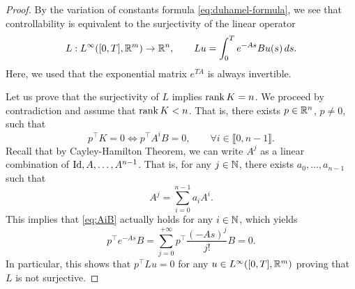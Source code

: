 \begin{proof}
    By the variation of constants formula \eqref{eq:duhamel-formula}, we see that controllability is equivalent to the surjectivity of the linear operator 
    \begin{equation}
        \label{eq:Lu}
        L : L^\infty([0,T],\mathbb{R}^m) \to \mathbb{R}^n, 
        \qquad 
        Lu =\int_0^T e^{-As}Bu(s)\, ds .
    \end{equation}
    Here, we used that the exponential matrix $e^{TA}$ is always invertible.

    Let us prove that the surjectivity of $L$ implies $\operatorname{rank} K=n$. We proceed by contradiction and assume that $\operatorname{rank} K<n$. That is, there exists $p\in \mathbb{R}^n$, $p\neq 0$, such that 
    \begin{equation}
        \label{eq:AiB}
        p^\top K = 0 
        \iff
        p^\top A^i B = 0, \qquad \forall i\in \llbracket 0,n-1\rrbracket.
    \end{equation}
    Recall that by Cayley-Hamilton Theorem, we can write $A^j$ as a linear combination of $\operatorname{Id}, A,\ldots, A^{n-1}$. That is, for any $j\in\mathbb{N}$, there exists $a_{0},\ldots, a_{n-1}$ such that
    \begin{equation}
        A^j = \sum_{i=0}^{n-1}a_i A^i.
    \end{equation}
    This implies that \eqref{eq:AiB} actually holds for any $i\in \mathbb{N}$, which yields
    \begin{equation}
        p^\top e^{-As}B =  \sum_{j=0}^{+\infty} p^\top \frac{(-As)^j}{j!}B = 0.
    \end{equation}
    In particular, this shows that $p^\top Lu=0$ for any $u\in L^\infty([0,T],\mathbb{R}^m)$ proving that $L$ is not surjective.


\end{proof}
